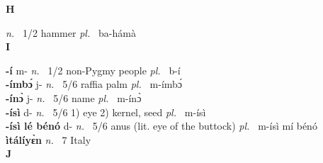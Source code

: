 \medskip
\noindent \large {\bfseries H}\normalsize\\
\medskip

  {\itshape n.~} 1/2 hammer {\itshape pl.~} ba-hámà    \\ 

\medskip
\noindent \large {\bfseries I}\normalsize\\
\medskip

\noindent
{\bfseries -í} m- {\itshape n.~} 1/2 non-Pygmy people {\itshape pl.~} b-í    \\ 
{\bfseries -ímbɔ́} j- {\itshape n.~} 5/6 raffia palm {\itshape pl.~} m-ímbɔ́    \\ 
{\bfseries -ínɔ̀} j- {\itshape n.~} 5/6 name {\itshape pl.~} m-ínɔ̀    \\ 
{\bfseries -ísì} d- {\itshape n.~} 5/6 1) eye 2) kernel, seed {\itshape pl.~} m-ísì    \\ 
{\bfseries -ísì lé bénó} d- {\itshape n.~} 5/6 anus (lit. eye of the buttock) {\itshape pl.~} m-ísì mí bénó \\ 
{\bfseries ìtálíyɛ̀n} {\itshape n.~} 7 Italy    \\ 

\medskip
\noindent \large {\bfseries J}\normalsize\\
\medskip

